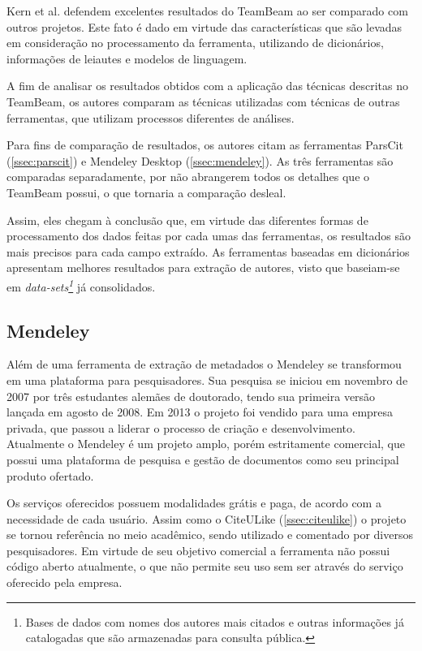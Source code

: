 Kern et al. defendem excelentes resultados do TeamBeam ao ser comparado com outros projetos. Este fato é dado em virtude das características que são levadas em consideração no processamento da ferramenta, utilizando de dicionários, informações de leiautes e modelos de linguagem.

A fim de analisar os resultados obtidos com a aplicação das técnicas descritas no TeamBeam, os autores comparam as técnicas utilizadas com técnicas de outras ferramentas, que utilizam processos diferentes de análises.

Para fins de comparação de resultados, os autores citam as ferramentas ParsCit (\autoref{ssec:parscit}) e Mendeley Desktop (\autoref{ssec:mendeley}). As três ferramentas são comparadas separadamente, por não abrangerem todos os detalhes que o TeamBeam possui, o que tornaria a comparação desleal.

Assim, eles chegam à conclusão que, em virtude das diferentes formas de processamento dos dados feitas por cada umas das ferramentas, os resultados são mais precisos para cada campo extraído. As ferramentas baseadas em dicionários apresentam melhores resultados para extração de autores, visto que baseiam-se em \textit{data-sets\footnote{Bases de dados com nomes dos autores mais citados e outras informações já catalogadas que são armazenadas para consulta pública.}} já consolidados.

\subsection{Mendeley}
\label{ssec:mendeley}

Além de uma ferramenta de extração de metadados o Mendeley se transformou em uma plataforma para pesquisadores. Sua pesquisa se iniciou em novembro de 2007 por três estudantes alemães de doutorado, tendo sua primeira versão lançada em agosto de 2008. Em 2013 o projeto foi vendido para uma empresa privada, que passou a liderar o processo de criação e desenvolvimento. Atualmente o Mendeley é um projeto amplo, porém estritamente comercial, que possui uma plataforma de pesquisa e gestão de documentos como seu principal produto ofertado.

Os serviços oferecidos possuem modalidades grátis e paga, de acordo com a necessidade de cada usuário. Assim como o CiteULike (\autoref{ssec:citeulike}) o projeto se tornou referência no meio acadêmico, sendo utilizado e comentado por diversos pesquisadores. Em virtude de seu objetivo comercial a ferramenta não possui código aberto atualmente, o que não permite seu uso sem ser através do serviço oferecido pela empresa.

